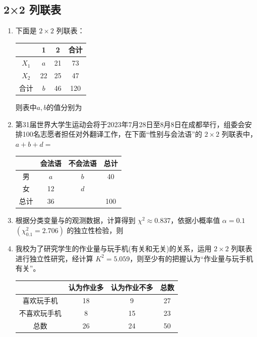 \clearpage

\subsection*{2×2 列联表}
\begin{enumerate}



\item 下面是 $2\times 2$ 列联表：
\begin{center}
\begin{tabular}{|c|c|c|c|}
\hline
 & 1 & 2 & 合计 \\
\hline
$X_{1}$ & $a$ & 21 & 73 \\
\hline
$X_{2}$ & 22 & 25 & 47 \\
\hline
合计 & $b$ & 46 & 120 \\
\hline
\end{tabular}
\end{center}
则表中$a, b$的值分别为

\item 第31届世界大学生运动会将于2023年7月28日至8月8日在成都举行，组委会安排100名志愿者担任对外翻译工作，在下面“性别与会法语”的 $2\times 2$ 列联表中，$a+b+d=$
\begin{center}
\begin{tabular}{|c|c|c|c|}
\hline
 & 会法语 & 不会法语 & 总计 \\
\hline
男 & $a$ & $b$ & 40 \\
\hline
女 & 12 & $d$ & \\
\hline
总计 & 36 & & 100 \\
\hline
\end{tabular}
\end{center}

\item 根据分类变量与的观测数据，计算得到 $\chi^{2}\approx 0.837$，依据小概率值 $\alpha=0.1$ $(\chi^{2}_{0.1}=2.706)$ 的独立性检验，则

\item 我校为了研究学生的作业量与玩手机(有关和无关)的关系，运用 $2\times 2$ 列联表进行独立性研究，经计算 $K^{2}=5.059$，则至少有的把握认为“作业量与玩手机有关”。
\begin{center}
\begin{tabular}{|c|c|c|c|}
\hline
 & 认为作业多 & 认为作业不多 & 总数 \\
\hline
喜欢玩手机 & 18 & 9 & 27 \\
\hline
不喜欢玩手机 & 8 & 15 & 23 \\
\hline
总数 & 26 & 24 & 50 \\
\hline
\end{tabular}
\end{center}


\end{enumerate}
